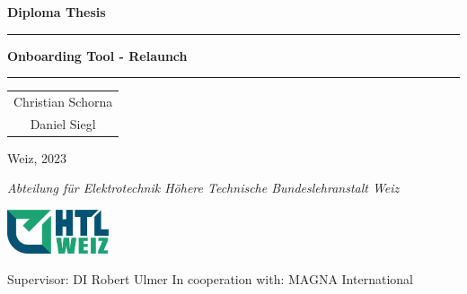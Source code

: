 
\begin{titlepage}
    \centering
    \null
    \vspace{2cm}

    {\large \textbf{Diploma Thesis}}
    \vspace{2cm}

    {\hrule\vspace{0.5cm}\huge \textbf{Onboarding Tool - Relaunch} \vspace{0.5cm}\hrule}
    \vspace{2cm}

    {\Large
        \begin{tabular}[t]{c}
            Christian Schorna \\
            Daniel Siegl
        \end{tabular}
    }
    \vspace{0.5cm}

    {\Large Weiz, 2023}
    \vfill

    {\it
        Abteilung für Elektrotechnik \linebreak
        Höhere Technische Bundeslehranstalt Weiz
    }
    \vspace{0.5cm}

    \includegraphics[width=3cm]{images/htl_logo.png}
    \vspace{2cm}

    Supervisor: DI Robert Ulmer \linebreak
    In cooperation with: MAGNA International
    \vspace{3cm}
\end{titlepage}